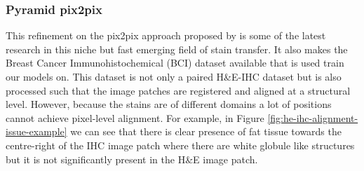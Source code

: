 \subsubsection{Pyramid pix2pix}

This refinement on the pix2pix approach proposed by  \textcite{Liu2022BCI:Pix2pix}  is some of the latest research in this niche but fast emerging field of stain transfer. It also makes the Breast Cancer Immunohistochemical (BCI) dataset available that is used train our models on. This dataset is not only a paired H\&E-IHC dataset but is also processed such that the image patches are registered and aligned at a structural level. However, because the stains are of different domains a lot of positions cannot achieve pixel-level alignment. For example, in Figure \ref{fig:he-ihc-alignment-issue-example} we can see that there is clear presence of fat tissue towards the centre-right of the IHC image patch where there are white globule like structures but it is not significantly present in the H\&E image patch.

